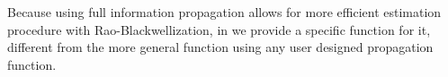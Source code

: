 




Because using full information propagation allows for more efficient estimation procedure with Rao-Blackwellization, in  we provide a specific function for it, different from the more general function using any user designed propagation function.

